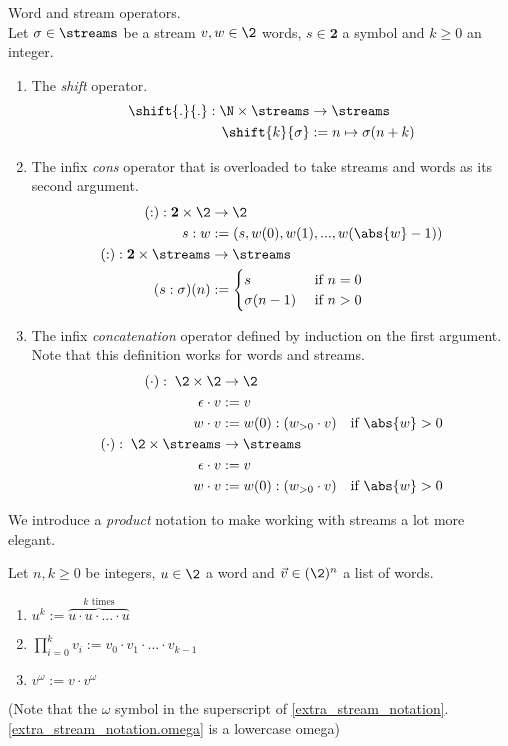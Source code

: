 \begin{definition}{Word and stream operators.}\\
	Let $\sigma\in\streams$ be a stream $v,w\in\2$ words, $s\in\mathbf{2}$ a symbol and $k\geq0$ an integer.
	\begin{enumerate}
		\item The \textit{shift} operator.
		\begin{align*}
			\shift{.}{.} : \N \times \streams &\to \streams \\
			\shift{k}{\sigma} &:= n \mapsto \sigma(n+k)
		\end{align*}
		\item The infix \textit{cons} operator that is overloaded to take streams and words as its second argument.
		\begin{align*}
			(:): \mathbf{2} \times \2 &\to \2 \\
			s : w &:= (s,w(0),w(1),...,w(\abs{w} - 1)) \\
			(:): \mathbf{2} \times \streams &\to \streams \\
			(s : \sigma)(n) &:= 
			\begin{cases}
			s &\text{ if }	n = 0 \\
			\sigma(n-1) &\text{ if }	n > 0
			\end{cases}
		\end{align*}
		\item The infix \textit{concatenation} operator defined by induction on the first argument. Note that this definition works for words and streams.
		\begin{align*}
			(\cdot):\;\2 \times \2 &\to \2 \\
			\epsilon \cdot v &:= v \\
			w \cdot v &:= w(0) : (w_{>0} \cdot v)  &\text{if } \abs{w}>0 \\
			(\cdot):\;\2 \times \streams &\to \streams \\
			\epsilon \cdot v &:= v \\
			w \cdot v &:= w(0) : (w_{>0} \cdot v) &\text{if } \abs{w}>0
		\end{align*}
	\end{enumerate}
\end{definition}

We introduce a \textit{product} notation to make working with streams a lot more elegant.

\begin{notation}\label{extra_stream_notation}
	Let $n,k\geq0$ be integers, $u\in\2$ a word and $\vec{v}\in(\2)^n$ a list of words.
	\begin{enumerate}
		\item $u^{k} := \overbrace{u\cdot u\cdot ... \cdot u}^{k \text{ times}}$
		\item $\prod_{i=0}^{k}v_i := v_0 \cdot v_1 \cdot ... \cdot v_{k-1}$
		\item $v^{\omega} := v\cdot v^{\omega}$ \label{extra_stream_notation.omega}
	\end{enumerate}
	(Note that the $\omega$ symbol in the superscript of \cref{extra_stream_notation}.\ref{extra_stream_notation.omega} is a lowercase omega)
\end{notation}


